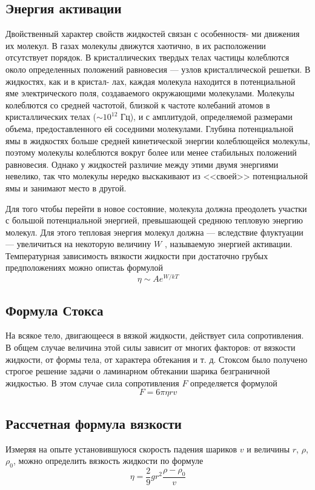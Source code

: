 \documentclass[a4paper,12pt]{article} %
\begin{document}
\subsection{Энергия активации}
	Двойственный характер свойств жидкостей связан с особенностя- ми движения их молекул. В газах молекулы движутся хаотично, в их расположении отсутствует порядок. В кристаллических твердых телах частицы колеблются около определенных положений равновесия — узлов кристаллической решетки. В жидкостях, как и в кристал- лах, каждая молекула находится в потенциальной яме электрического поля, создаваемого окружающими молекулами. Молекулы колеблются со средней частотой, близкой к частоте колебаний атомов в кристаллических телах ($\sim 10^{12}$ Гц), и с амплитудой, определяемой размерами объема, предоставленного ей соседними молекулами. Глубина потенциальной ямы в жидкостях больше средней кинетической энергии колеблющейся молекулы, поэтому молекулы колеблются вокруг более или менее стабильных положений равновесия. Однако у жидкостей различие между этими двумя энергиями невелико, так что молекулы нередко выскакивают из <<своей>> потенциальной ямы и занимают место в другой.
	
	Для того чтобы перейти в новое состояние, молекула должна преодолеть участки с большой потенциальной энергией, превышающей среднюю тепловую энергию молекул. Для этого тепловая энергия молекул должна — вследствие флуктуации — увеличиться на некоторую величину $W$ , называемую энергией активации. Температурная зависимость вязкости жидкости при достаточно грубых предположениях можно опистаь формулой
	\begin{equation}
		\eta \sim A e^{W/kT}
	\end{equation}
	
\subsection{Формула Стокса}
	На всякое тело, двигающееся в вязкой жидкости, действует сила сопротивления. В общем случае величина этой силы зависит от многих факторов: от вязкости жидкости, от формы тела, от характера обтекания и т. д. Стоксом было получено строгое решение задачи о ламинарном обтекании шарика безграничной жидкостью. В этом случае сила сопротивления $F$ определяется формулой
	\begin{equation}
		F = 6\pi \eta r v
	\end{equation}
	
\subsection{Рассчетная формула вязкости}
	Измеряя на опыте установившуюся скорость падения шариков $v$ и величины $r$, $\rho$, $\rho_0$, можно определить вязкость жидкости по формуле
	\begin{equation}
		\label{formula}
		\eta = \frac{2}{9} g r^2 \frac{\rho - \rho_0}{v}
	\end{equation}
\end{document}
